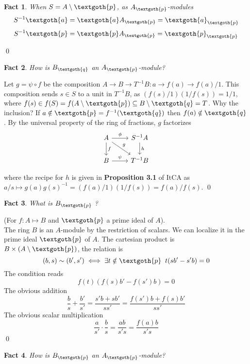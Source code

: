 \documentclass{article}
\newtheorem{theorem}{Fact}[section]
\begin{document}
\bigskip
\begin{theorem}
When $S=A \setminus \textgoth{p}$, as $A_\textgoth{p}$-modules
\[
S^{-1}\textgoth{a} = \textgoth{a}A_\textgoth{p} = \textgoth{a}_\textgoth{p} 
\]
\[
S^{-1}\textgoth{p} = \textgoth{p}A_\textgoth{p} = \textgoth{p}_\textgoth{p} 
\]
\end{theorem}
\qed

\bigskip
\begin{theorem}
\label{b_q_as_a_q}
How is $B_\textgoth{q}$ an $A_\textgoth{p}$-module?
\end{theorem}

\noindent
Let $g = \psi \circ f$ be the composition $A \rightarrow B \rightarrow T^{-1}B : a \rightarrow f(a) \rightarrow f(a)/1 $. This composition sends $s \in S$ to a unit in $T^{-1}B$, as $(f(s)/1)(1/f(s)) = 1/1$, where $f(s) \in f(S) = f(A \setminus \textgoth{p}) \subseteq B \setminus \textgoth{q} = T$. Why the inclusion? If $a \notin \textgoth{p} = f^{-1}(\textgoth{q})$ then $f(a) \notin \textgoth{q}$. By the universal property of the ring of fractions, $g$ factorizes
\[
     \begin{tikzcd}
     A \arrow{r}{\phi} \arrow{d}{f} \arrow{dr}{g} & S^{-1}A \arrow{d}{h} \\
     B \arrow{r}{\psi} & T^{-1}B
     \end{tikzcd}
\]

\noindent
where the recipe for $h$ is given in \textbf{Proposition 3.1} of ItCA as $a/s \mapsto g(a)g(s)^{-1} = (f(a)/1)(1/f(s)) = f(a)/f(s)$.
\qed

\begin{theorem}
What is $B_\textgoth{p}$ ?
\end{theorem}

\noindent
(For $f: A \mapsto B$ and $\textgoth{p}$ a prime ideal of $A$). \\
The ring $B$ is an $A$-module by the restriction of scalars. We can localize it in the prime ideal $\textgoth{p}$  of $A$. The cartesian product is $B \times (A \setminus \textgoth{p})$, the relation is 
\[
(b, s) \sim (b', s') \iff \exists t \notin \textgoth{p} \; \; t(sb' - s'b) = 0
\]
The condition reads
\[
f(t)(f(s)b' - f(s')b) = 0
\]
The obvious addition 
\[
\frac{b}{s} + \frac{b'}{s'} = \frac{s'b + sb'}{ss'} = \frac{f(s')b + f(s)b'}{ss'}
\]
The obvious scalar multiplication
\[
\frac{a}{s'} \cdot \frac{b}{s} = \frac{ab}{s's} = \frac{f(a)b}{s's}
\]
\qed

\bigskip
\begin{theorem}
How is $B_\textgoth{p}$ an $A_\textgoth{p}$-module?
\end{theorem}
\end{document}
